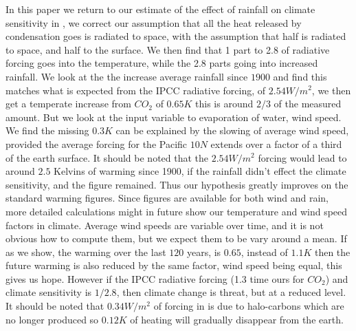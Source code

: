 \documentclass{book}
\begin{document}
   In this paper we return to our estimate of the effect of rainfall on climate sensitivity in \cite{Adams}, we correct our assumption that all the heat released by condensation goes is radiated to space, with the
   assumption that half is radiated to space, and half to the surface. We then find that 1 part to 2.8 of radiative forcing goes into the temperature, while the 2.8 parts going into increased rainfall. We look at the the increase average rainfall since $1900$ and find this matches what is expected from the IPCC radiative forcing, \cite{Radiative} of $2.54 W/m^2$, we then get a temperate increase from $CO_2$ of $0.65K$ this is around $2/3$ of the measured amount. But we look at the input variable to evaporation of water, wind speed. We find the missing $0.3K$ can be explained by the slowing of average wind speed, provided the average forcing for the Pacific $10N$ extends over a factor of a third of the earth surface. It should be noted that the $2.54 W/m^2$ forcing would lead to around $2.5$ Kelvins of warming since 1900, if the rainfall didn't effect the climate sensitivity, and the \cite{wikisense} figure remained. Thus our hypothesis greatly improves on the standard warming figures. Since figures are available for both wind and rain, more detailed calculations might in future show our temperature and wind speed factors in climate. Average wind speeds are variable over time, and it is not obvious how to compute them, but we expect them to be vary around a mean. If as we show, the warming over the last $120$ years, is $0.65$, instead of $1.1K$ then the future warming is also reduced by the same factor, wind speed being equal, this gives us hope. However if the IPCC radiative forcing (1.3 time ours for $CO_2$) and climate sensitivity is $1/2.8$, then climate change is threat, but at a reduced level. It should be noted that $0.34 W/m^2$ of forcing in \cite{Radiative} is due to halo-carbons which are no longer produced so $0.12K$ of heating will gradually disappear from the earth.
           		
\end{document}

